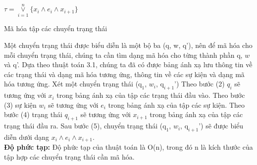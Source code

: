 \documentclass[a4paper,13pt,oneside,openany]{book}
\newenvironment{megaalgorithm}[1][htb]
{\renewcommand{\algorithmcfname}{Thuật toán}%
	\begin{algorithm}[#1]%
}{\end{algorithm}}
\begin{document}
\begin{flushleft}
\begin{megaalgorithm}[H]
			\Return $\tau = \overset{n}{\underset{i=1}{\lor}} \{x_i \land e_i \land x_{i+1}\}$
				
			\caption{Mã hóa tập các chuyển trạng thái}
		\end{megaalgorithm}
		
		Một chuyển trạng thái được biểu diễn là một bộ ba (q, w, q'), nên để mã hóa cho mỗi chuyển trạng thái, chúng ta cần tìm dạng mã hóa cho từng thành phần q, $w$ và q'. Dựa theo thuật toán 3.1, chúng ta đã có được bảng ánh xạ lưu thông tin về các trạng thái và dạng mã hóa tương ứng, thông tin về các sự kiện và dạng mã hóa tương ứng. Xét một chuyển trạng thái ($\textrm{q}_1$, $w_i$, $\textrm{q}_{i+1}$') Theo bước (2) $q_{i}$ sẽ tương ứng với $x_i$ trong bảng ánh xạ của tập các trạng thái đầu vào. Theo bước (3) sự kiện $w_i$ sẽ tương ứng với $e_i$ trong bảng ánh xạ của tập các sự kiện. Theo bước (4) trạng thái $q_{i+1}$ sẽ tương ứng với $x_{i+1}$ trong bảng ánh xạ của tập các trạng thái đầu ra. Sau bước (5), chuyển trạng thái ($\textrm{q}_1$, $w_i$, $\textrm{q}_{i+1}$') sẽ được biểu diễn dưới dạng $x_{i} \land e_i \land x_{i+1}$.\\
		\textbf{Độ phức tạp:} Độ phức tạp của thuật toán là O(n), trong đó n là kích thước của tập hợp các chuyển trạng thái cần mã hóa.

\end{flushleft}
\end{document}

